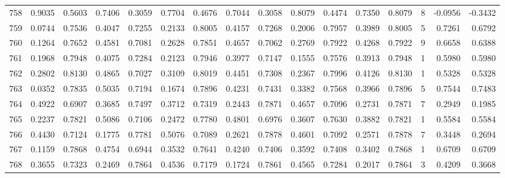 \begin{tabular}{lrrrrrrrrrrrrrrr}
758 &      0.9035 &  0.5603 &  0.7406 &  0.3059 &  0.7704 &  0.4676 &  0.7044 &  0.3058 &  0.8079 &  0.4474 &   0.7350 &     0.8079 &      8 &                   -0.0956 &                    -0.3432 \\
759 &      0.0744 &  0.7536 &  0.4047 &  0.7255 &  0.2133 &  0.8005 &  0.4157 &  0.7268 &  0.2006 &  0.7957 &   0.3989 &     0.8005 &      5 &                    0.7261 &                     0.6792 \\
760 &      0.1264 &  0.7652 &  0.4581 &  0.7081 &  0.2628 &  0.7851 &  0.4657 &  0.7062 &  0.2769 &  0.7922 &   0.4268 &     0.7922 &      9 &                    0.6658 &                     0.6388 \\
761 &      0.1968 &  0.7948 &  0.4075 &  0.7284 &  0.2123 &  0.7946 &  0.3977 &  0.7147 &  0.1555 &  0.7576 &   0.3913 &     0.7948 &      1 &                    0.5980 &                     0.5980 \\
762 &      0.2802 &  0.8130 &  0.4865 &  0.7027 &  0.3109 &  0.8019 &  0.4451 &  0.7308 &  0.2367 &  0.7996 &   0.4126 &     0.8130 &      1 &                    0.5328 &                     0.5328 \\
763 &      0.0352 &  0.7835 &  0.5035 &  0.7194 &  0.1674 &  0.7896 &  0.4231 &  0.7431 &  0.3382 &  0.7568 &   0.3966 &     0.7896 &      5 &                    0.7544 &                     0.7483 \\
764 &      0.4922 &  0.6907 &  0.3685 &  0.7497 &  0.3712 &  0.7319 &  0.2443 &  0.7871 &  0.4657 &  0.7096 &   0.2731 &     0.7871 &      7 &                    0.2949 &                     0.1985 \\
765 &      0.2237 &  0.7821 &  0.5086 &  0.7106 &  0.2472 &  0.7780 &  0.4801 &  0.6976 &  0.3607 &  0.7630 &   0.3882 &     0.7821 &      1 &                    0.5584 &                     0.5584 \\
766 &      0.4430 &  0.7124 &  0.1775 &  0.7781 &  0.5076 &  0.7089 &  0.2621 &  0.7878 &  0.4601 &  0.7092 &   0.2571 &     0.7878 &      7 &                    0.3448 &                     0.2694 \\
767 &      0.1159 &  0.7868 &  0.4754 &  0.6944 &  0.3532 &  0.7641 &  0.4240 &  0.7406 &  0.3592 &  0.7408 &   0.3402 &     0.7868 &      1 &                    0.6709 &                     0.6709 \\
768 &      0.3655 &  0.7323 &  0.2469 &  0.7864 &  0.4536 &  0.7179 &  0.1724 &  0.7861 &  0.4565 &  0.7284 &   0.2017 &     0.7864 &      3 &                    0.4209 &                     0.3668 \\

\end{tabular}

